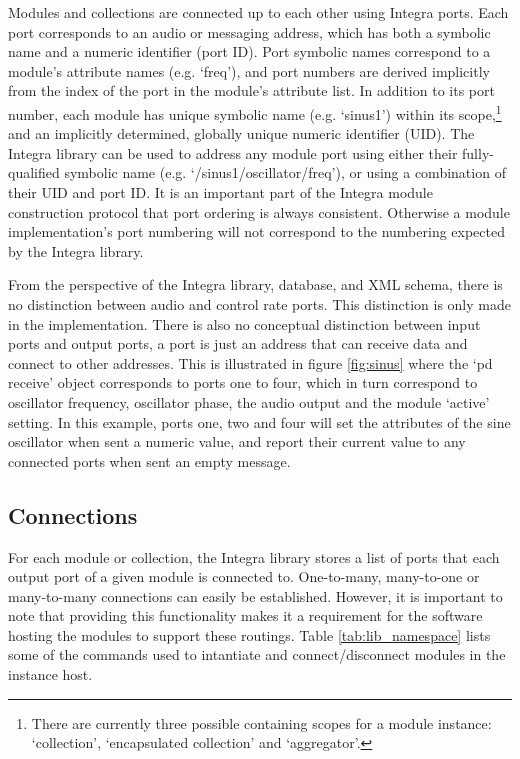\documentclass[10pt,journal,final]{IEEEtran}
\begin{document}
Modules and collections are connected up to each other using Integra ports. Each port corresponds to an audio or messaging address, which has both a symbolic name and a numeric identifier (port ID). Port symbolic names correspond to a module's attribute names (e.g. `freq'), and port numbers are derived implicitly from the index of the port in the module's attribute list. 
In addition to its port number, each module has unique symbolic name
(e.g. `sinus1') within its scope,\footnote{There are currently three possible containing scopes for
a module instance: `collection', `encapsulated collection' and `aggregator'.} and an implicitly determined, globally
unique numeric identifier (UID).
The Integra library can be used to address any module port using either their fully-qualified symbolic name (e.g. `/sinus1/oscillator/freq'), or using a combination of their UID and port ID. It is an important part of the Integra module construction protocol that port ordering is always consistent. Otherwise a module implementation's port numbering will not correspond to the numbering expected by the Integra library.

From the perspective of the Integra library, database, and XML schema,
there is no distinction between audio and control rate ports. This
distinction is only made in the implementation. There is also no
conceptual distinction between input ports and output ports, a port is
just an address that can receive data and connect to other addresses.
This is illustrated in figure \ref{fig:sinus} where the `pd receive'
object corresponds to ports one to four, which in turn correspond to
oscillator frequency, oscillator phase, the audio output and the module `active' setting. In this example, ports one, two and four will set the attributes of the sine oscillator when sent a numeric value, and report their current value to any connected ports when sent an empty message.

\subsection{Connections}\label{subsec:connections}

For each module or collection, the Integra library stores a list of ports that each output port of a given module is connected to. One-to-many, many-to-one or many-to-many connections can easily be established. However, it is important to note that providing this functionality makes it a requirement for the software hosting the modules to support these routings. Table \ref{tab:lib_namespace} lists some of the commands used to intantiate and connect/disconnect modules in the instance host.
\end{document}
